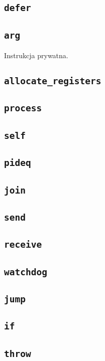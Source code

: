\subsection{\texttt{defer}}
\subsection{\texttt{arg}}

Instrukcja prywatna.

\subsection{\texttt{allocate\_registers}}

\subsection{\texttt{process}}
\subsection{\texttt{self}}
\subsection{\texttt{pideq}}
\subsection{\texttt{join}}
\subsection{\texttt{send}}
\subsection{\texttt{receive}}

\subsection{\texttt{watchdog}}

\subsection{\texttt{jump}}
\subsection{\texttt{if}}

\subsection{\texttt{throw}}

